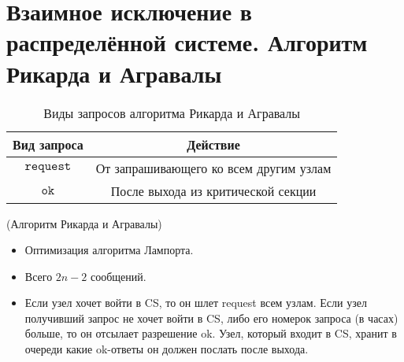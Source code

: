 \section{Взаимное исключение в распределённой системе. Алгоритм Рикарда и Агравалы}

\begin{table}[!ht]
    \centering
    \begin{tabular}{|c|c|} \hline
        Вид запроса & Действие \\ \hline
        $\texttt{request}$ & От запрашивающего ко всем другим узлам\\ \hline
        $\texttt{ok}$ & После выхода из критической секции \\ \hline
    \end{tabular}
    \caption{Виды запросов алгоритма Рикарда и Агравалы}
\end{table}

\begin{algorithm}(Алгоритм Рикарда и Агравалы)
\begin{itemize}
    \item Оптимизация алгоритма Лампорта.
    \item Всего $2n-2$ сообщений.
    \item Если узел хочет войти в CS, то он шлет request всем узлам.
        Если узел получивший запрос не хочет войти в CS, либо его номерок 
        запроса (в часах) больше, то он отсылает разрешение ok.
        Узел, который входит в CS, хранит в очереди какие ok-ответы он должен 
        послать после выхода.
\end{itemize}
\end{algorithm}

